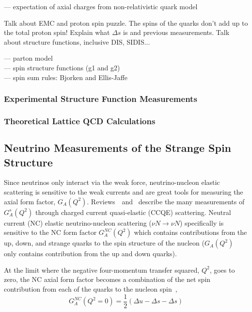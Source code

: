   --- expectation of axial charges from non-relativistic quark model

  Talk about EMC and proton spin puzzle. The spins of the quarks don't add up
  to the total proton spin! Explain what $\Delta s$ is and previous
  measurements. Talk about structure functions, inclusive DIS, SIDIS...

  --- parton model \\
  --- spin structure functions (g1 and g2) \\
  --- spin sum rules: Bjorken and Ellis-Jaffe \\

  \subsubsection{Experimental Structure Function Measurements}

  \subsubsection{Theoretical Lattice QCD Calculations}



  \subsection{Neutrino Measurements of the Strange Spin Structure}
  \label{sec:neutrinos}
    Since neutrinos only interact via the weak force, neutrino-nucleon elastic
    scattering is sensitive to the weak currents and are great tools for
    measuring the axial form factor, $G_A(Q^2)$.
    Reviews~\cite{Lyubushkin:2008pe}~and~\cite{Formaggio:2013kya} describe the
    many measurements of $G_A^s(Q^2)$ through charged current quasi-elastic
    (CCQE) scattering. Neutral current (NC) elastic neutrino-nucleon scattering
    ($\nu N \rightarrow \nu N$) specifically is sensitive to the NC form factor
    $G_A^{NC}(Q^2)$ which contains contributions from the up, down, and strange
    quarks to the spin structure of the nucleon ($G_A(Q^2)$ only contains
    contribution from the up and down quarks).

    At the limit where the negative four-momentum transfer squared, $Q^2$, goes
    to zero, the NC axial form factor becomes a combination of the net spin
    contribution from each of the quarks to the nucleon spin~\cite{Bass:2007zzb},
    \begin{equation*}
      G_A^{NC}(Q^2 = 0) = \frac{1}{2}(\Delta u - \Delta s - \Delta s)
    \end{equation*}

